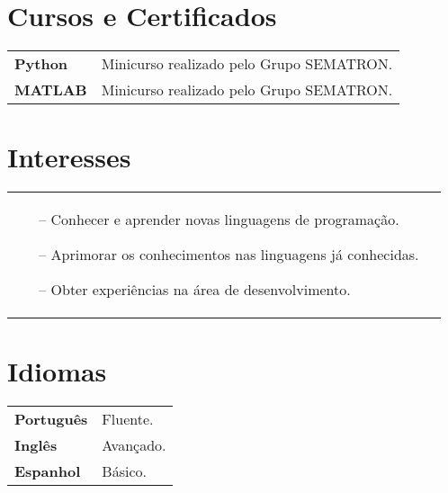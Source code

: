 \documentclass[a4paper,12pt]{article}
\begin{document}
\section{Cursos e Certificados}
\begin{tabularx}{\linewidth}{@{}l X@{}}
\textbf{Python} &  \normalsize{Minicurso realizado pelo Grupo SEMATRON.}\\
\textbf{MATLAB}  &  \normalsize{Minicurso realizado pelo Grupo SEMATRON.}\\

\end{tabularx}

\begin{multicols}{2}
\section{Interesses}
\begin{tabularx}{\linewidth}{@{}l l@{}}
\begin{minipage}[t]{\linewidth}
    \begin{itemize}[nosep,after=\strut, leftmargin=1em, itemsep=3pt]
        \item[--] Conhecer e aprender novas linguagens de programação.
        \item[--] Aprimorar os conhecimentos nas linguagens já conhecidas.
        \item[--] Obter experiências na área de desenvolvimento.
    \end{itemize}
    \end{minipage}
\end{tabularx}
\section{Idiomas}
\begin{tabularx}{\linewidth}{@{}l l@{}}
\textbf{Português} & \normalsize{Fluente.}\\
\textbf{Inglês} & \normalsize{Avançado.}\\
\textbf{Espanhol} & \normalsize{Básico.}\\
\end{tabularx}
\end{multicols}

\vfill
{}
\end{document}
